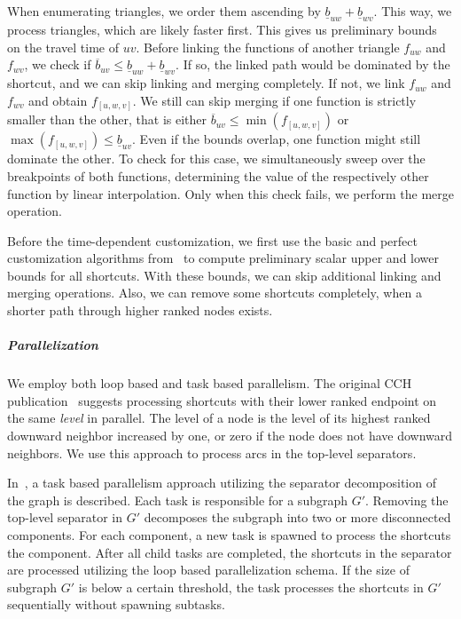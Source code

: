 \documentclass[a4paper,UKenglish,cleveref,autoref]{lipics-v2019}
\begin{document}
When enumerating triangles, we order them ascending by $\underline{b}_{u w} + \underline{b}_{w v}$.
This way, we process triangles, which are likely faster first.
This gives us preliminary bounds on the travel time of $u v$.
Before linking the functions of another triangle $f_{u w}$ and $f_{w v}$, we check if $\overline{b}_{u v} \leq \underline{b}_{u w} + \underline{b}_{w v}$.
If so, the linked path would be dominated by the shortcut, and we can skip linking and merging completely.
If not, we link $f_{u w}$ and $f_{w v}$ and obtain $f_{[u,w,v]}$.
We still can skip merging if one function is strictly smaller than the other, that is either $\overline{b}_{u v} \leq \min(f_{[u,w,v]})$ or $\max(f_{[u,w,v]}) \leq \underline{b}_{u v}$.
Even if the bounds overlap, one function might still dominate the other.
To check for this case, we simultaneously sweep over the breakpoints of both functions, determining the value of the respectively other function by linear interpolation.
Only when this check fails, we perform the merge operation.

Before the time-dependent customization, we first use the basic and perfect customization algorithms from~\cite{dsw-cch-15} to compute preliminary scalar upper and lower bounds for all shortcuts.
With these bounds, we can skip additional linking and merging operations.
Also, we can remove some shortcuts completely, when a shorter path through higher ranked nodes exists.

\subparagraph*{Parallelization}

We employ both loop based and task based parallelism. %
The original CCH publication~\cite{dsw-cch-15} suggests processing shortcuts with their lower ranked endpoint on the same \emph{level} in parallel.
The level of a node is the level of its highest ranked downward neighbor increased by one, or zero if the node does not have downward neighbors.
We use this approach to process arcs in the top-level separators.

In~\cite{bsw-rttau-19}, a task based parallelism approach utilizing the separator decomposition of the graph is described.
Each task is responsible for a subgraph $G'$.
Removing the top-level separator in $G'$ decomposes the subgraph into two or more disconnected components.
For each component, a new task is spawned to process the shortcuts the component.
After all child tasks are completed, the shortcuts in the separator are processed utilizing the loop based parallelization schema.
If the size of subgraph $G'$ is below a certain threshold, the task processes the shortcuts in $G'$ sequentially without spawning subtasks.
\end{document}
